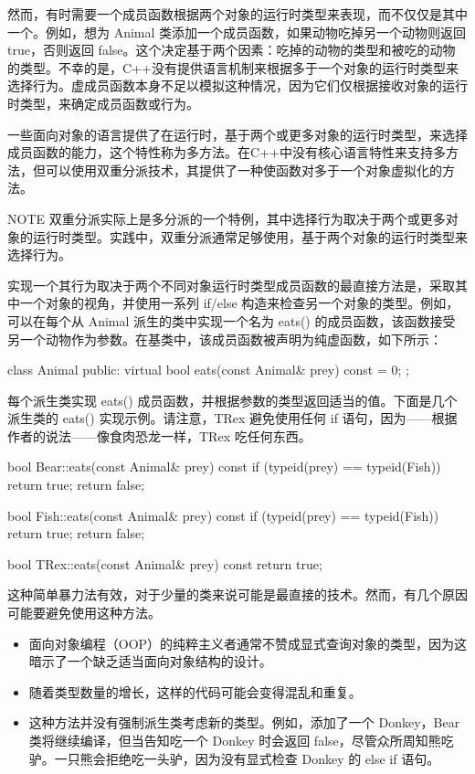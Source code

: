 然而，有时需要一个成员函数根据两个对象的运行时类型来表现，而不仅仅是其中一个。例如，想为 Animal 类添加一个成员函数，如果动物吃掉另一个动物则返回 true，否则返回 false。这个决定基于两个因素：吃掉的动物的类型和被吃的动物的类型。不幸的是，C++没有提供语言机制来根据多于一个对象的运行时类型来选择行为。虚成员函数本身不足以模拟这种情况，因为它们仅根据接收对象的运行时类型，来确定成员函数或行为。

一些面向对象的语言提供了在运行时，基于两个或更多对象的运行时类型，来选择成员函数的能力，这个特性称为多方法。在C++中没有核心语言特性来支持多方法，但可以使用双重分派技术，其提供了一种使函数对多于一个对象虚拟化的方法。

\begin{myNotic}{NOTE}
双重分派实际上是多分派的一个特例，其中选择行为取决于两个或更多对象的运行时类型。实践中，双重分派通常足够使用，基于两个对象的运行时类型来选择行为。
\end{myNotic}


实现一个其行为取决于两个不同对象运行时类型成员函数的最直接方法是，采取其中一个对象的视角，并使用一系列 if/else 构造来检查另一个对象的类型。例如，可以在每个从 Animal 派生的类中实现一个名为 eats() 的成员函数，该函数接受另一个动物作为参数。在基类中，该成员函数被声明为纯虚函数，如下所示：

\begin{cpp}
class Animal
{
    public:
        virtual bool eats(const Animal& prey) const = 0;
};
\end{cpp}

每个派生类实现 eats() 成员函数，并根据参数的类型返回适当的值。下面是几个派生类的 eats() 实现示例。请注意，TRex 避免使用任何 if 语句，因为——根据作者的说法——像食肉恐龙一样，TRex 吃任何东西。

\begin{cpp}
bool Bear::eats(const Animal& prey) const
{
    if (typeid(prey) == typeid(Fish)) { return true; }
    return false;
}

bool Fish::eats(const Animal& prey) const
{
    if (typeid(prey) == typeid(Fish)) { return true; }
    return false;
}

bool TRex::eats(const Animal& prey) const
{
    return true;
}
\end{cpp}

这种简单暴力法有效，对于少量的类来说可能是最直接的技术。然而，有几个原因可能要避免使用这种方法。

\begin{itemize}
\item
面向对象编程（OOP）的纯粹主义者通常不赞成显式查询对象的类型，因为这暗示了一个缺乏适当面向对象结构的设计。

\item
随着类型数量的增长，这样的代码可能会变得混乱和重复。

\item
这种方法并没有强制派生类考虑新的类型。例如，添加了一个 Donkey，Bear 类将继续编译，但当告知吃一个 Donkey 时会返回 false，尽管众所周知熊吃驴。一只熊会拒绝吃一头驴，因为没有显式检查 Donkey 的 else if 语句。
\end{itemize}


